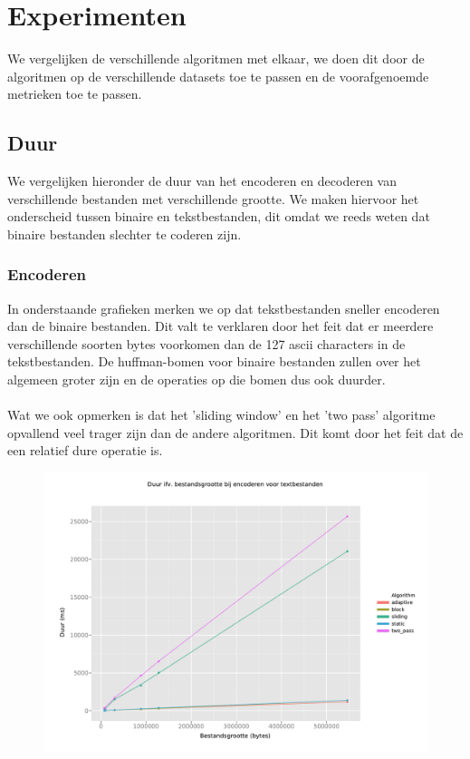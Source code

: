 \documentclass[a4paper,12pt]{report}
\begin{document}
\chapter{Experimenten}
We vergelijken de verschillende algoritmen met elkaar, we doen dit door de algoritmen op de verschillende datasets toe te passen en de voorafgenoemde metrieken toe te passen.
\section{Duur}
We vergelijken hieronder de duur van het encoderen en decoderen van verschillende bestanden met verschillende grootte. We maken hiervoor het onderscheid tussen binaire en tekstbestanden, dit omdat we reeds weten dat binaire bestanden slechter te coderen zijn.
\subsection{Encoderen}
In onderstaande grafieken merken we op dat tekstbestanden sneller encoderen dan de binaire bestanden. Dit valt te verklaren door het feit dat er meerdere verschillende soorten bytes voorkomen dan de 127 ascii characters in de tekstbestanden. De huffman-bomen voor binaire bestanden zullen over het algemeen groter zijn en de operaties op die bomen dus ook duurder. \\ \\
Wat we ook opmerken is dat het 'sliding window' en het 'two pass' algoritme opvallend veel trager zijn dan de andere algoritmen. Dit komt door het feit dat de  een relatief dure operatie is.
\begin{figure}[H]
	\includegraphics[scale=.6]{../experimenten/grafieken/duur/encode_textbestanden}
\end{figure}
\end{document}
